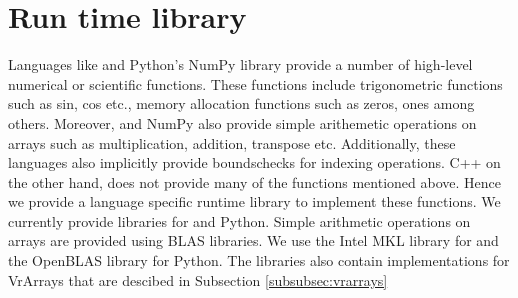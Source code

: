 \section{Run time library}
Languages like \matlab and Python's NumPy library provide a number of high-level numerical or scientific functions. These functions include trigonometric functions such as sin, cos etc., memory allocation functions such as zeros, ones among others. Moreover, \matlab and NumPy also provide simple arithemetic operations on arrays such as multiplication, addition, transpose etc. Additionally, these languages also implicitly provide boundschecks for indexing operations. C++ on the other hand, does not provide many of the functions mentioned above. Hence we provide a language specific runtime library to implement these functions. We currently provide libraries for \matlab and Python. Simple arithmetic operations on arrays are provided using BLAS libraries. We use the Intel MKL library for \matlab and the OpenBLAS library for Python. The libraries also contain implementations for VrArrays that are descibed in Subsection \ref{subsubsec:vrarrays}
